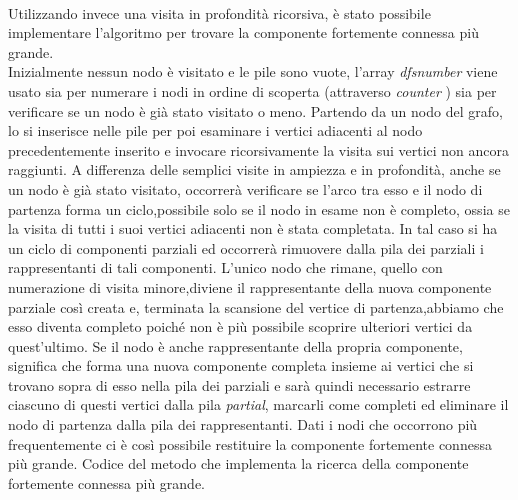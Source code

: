 \documentclass[twoside,openright,titlepage,fleqn,
	headinclude,11pt,a4paper,BCOR5mm,footinclude,pdftex
	]{scrbook}
\begin{document}

\\

\newpage
Utilizzando invece una visita in profondità ricorsiva, è stato possibile implementare l'algoritmo per trovare la componente fortemente connessa più grande.\\Inizialmente nessun nodo è visitato e le pile sono vuote, l'array \textit{dfsnumber} viene usato sia per numerare i nodi in ordine di scoperta (attraverso \textit{counter} ) sia per verificare se un nodo è già stato visitato o meno. Partendo da un nodo del grafo, lo si inserisce nelle pile per poi esaminare i vertici adiacenti al nodo precedentemente inserito e invocare ricorsivamente la visita sui vertici non ancora raggiunti. A differenza delle semplici visite in ampiezza e in profondità, anche se un nodo è già stato visitato, occorrerà verificare se l'arco tra esso e il nodo di partenza forma un ciclo,possibile solo se il nodo in esame non è completo, ossia se la visita di tutti i suoi vertici adiacenti non è stata completata. In tal caso si ha un ciclo di componenti parziali ed occorrerà rimuovere dalla pila dei parziali i rappresentanti di tali componenti. L'unico nodo che rimane, quello con numerazione di visita minore,diviene il rappresentante della nuova componente parziale così creata e, terminata la scansione del vertice di partenza,abbiamo che esso diventa completo poiché non è più possibile scoprire ulteriori vertici da quest'ultimo. Se il nodo è anche rappresentante della propria componente, significa che forma una nuova componente completa insieme ai vertici che si trovano sopra di esso nella pila dei parziali e sarà quindi necessario estrarre ciascuno di questi vertici dalla pila \textit{partial}, marcarli come completi ed eliminare il nodo di partenza dalla pila dei rappresentanti.
Dati i nodi che occorrono più frequentemente ci è così possibile restituire la componente fortemente connessa più grande.\newpage
Codice del metodo che implementa la ricerca della componente fortemente connessa più grande.
 \newpage

\end{document}
